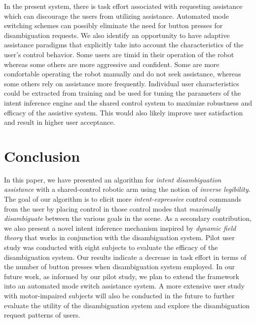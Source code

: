  In the present system, there is task effort associated with requesting assistance which can discourage the users from utilizing assistance. Automated mode switching schemes can possibly eliminate the need for button presses for disambiguation requests. 
 We also identify an opportunity to have adaptive assistance paradigms that explicitly take into account the characteristics of the user's control behavior. Some users are timid in their operation of the robot whereas some others are more aggressive and confident. Some are more comfortable operating the robot manually and do not seek assistance, whereas some others rely on assistance more frequently. Individual user characteristics could be extracted from training and be used for tuning the parameters of the intent inference engine and the shared control system to maximize robustness and efficacy of the assistive system. This would also likely improve user satisfaction and result in higher user acceptance. 
 
  
\section{Conclusion}\label{sec:conclusions}
In this paper, we have presented an algorithm for \textit{intent disambiguation assistance} with a shared-control robotic arm using the notion of \textit{inverse legibility}. The goal of our algorithm is to elicit more \textit{intent-expressive} control commands from the user by placing control in those control modes that \textit{maximally disambiguate} between the various goals in the scene. As a secondary contribution, we also present a novel intent inference mechanism inspired by \textit{dynamic field theory} that works in conjunction with the disambiguation system. Pilot user study was conducted with eight subjects to evaluate the efficacy of the disambiguation system. Our results indicate a decrease in task effort in terms of the number of button presses when disambiguation system employed. In our future work, as informed by our pilot study, we plan to extend the framework into an automated mode switch assistance system. A more extensive user study with motor-impaired subjects will also be conducted in the future to further evaluate the utility of the disambiguation system and explore the disambiguation request patterns of users.  

